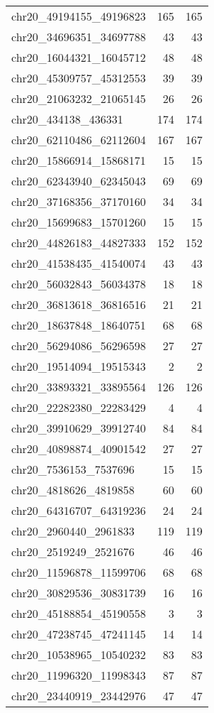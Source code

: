 \begin{longtable}{lrr}
chr20_49194155_49196823 & 165 & 165 \\
chr20_34696351_34697788 & 43 & 43 \\
chr20_16044321_16045712 & 48 & 48 \\
chr20_45309757_45312553 & 39 & 39 \\
chr20_21063232_21065145 & 26 & 26 \\
chr20_434138_436331 & 174 & 174 \\
chr20_62110486_62112604 & 167 & 167 \\
chr20_15866914_15868171 & 15 & 15 \\
chr20_62343940_62345043 & 69 & 69 \\
chr20_37168356_37170160 & 34 & 34 \\
chr20_15699683_15701260 & 15 & 15 \\
chr20_44826183_44827333 & 152 & 152 \\
chr20_41538435_41540074 & 43 & 43 \\
chr20_56032843_56034378 & 18 & 18 \\
chr20_36813618_36816516 & 21 & 21 \\
chr20_18637848_18640751 & 68 & 68 \\
chr20_56294086_56296598 & 27 & 27 \\
chr20_19514094_19515343 & 2 & 2 \\
chr20_33893321_33895564 & 126 & 126 \\
chr20_22282380_22283429 & 4 & 4 \\
chr20_39910629_39912740 & 84 & 84 \\
chr20_40898874_40901542 & 27 & 27 \\
chr20_7536153_7537696 & 15 & 15 \\
chr20_4818626_4819858 & 60 & 60 \\
chr20_64316707_64319236 & 24 & 24 \\
chr20_2960440_2961833 & 119 & 119 \\
chr20_2519249_2521676 & 46 & 46 \\
chr20_11596878_11599706 & 68 & 68 \\
chr20_30829536_30831739 & 16 & 16 \\
chr20_45188854_45190558 & 3 & 3 \\
chr20_47238745_47241145 & 14 & 14 \\
chr20_10538965_10540232 & 83 & 83 \\
chr20_11996320_11998343 & 87 & 87 \\
chr20_23440919_23442976 & 47 & 47 \\

\end{longtable}
